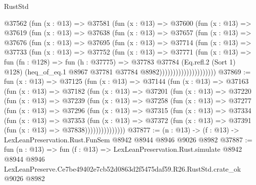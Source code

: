 \begin{lexlean}{RustStd}
\begin{coremodule}
                  @37562
                    (fun (x : @13) =>
                    @37581
                      (fun (x : @13) =>
                      @37600
                        (fun (x : @13) =>
                        @37619
                          (fun (x : @13) =>
                          @37638
                            (fun (x : @13) =>
                            @37657
                              (fun (x : @13) =>
                              @37676
                                (fun (x : @13) =>
                                @37695
                                  (fun (x : @13) =>
                                  @37714
                                    (fun (x : @13) =>
                                    @37733
                                      (fun (x : @13) =>
                                      @37752
                                        (fun (x : @13) =>
                                        @37771
                                          (fun (x : @13) =>
                                          fun (fn : @128) =>
                                          fun (h : @37775) =>
                                          @37783
                                            @37784
                                            (Eq.refl.{2} (Sort 1) @128)
                                            (heq_of_eq.{1}
                                              @8967
                                              @37781
                                              @37784
                                              @8982)))))))))))))))))))))
@37869 := fun (x : @13) =>
  @37125
    (fun (x : @13) =>
    @37144
      (fun (x : @13) =>
      @37163
        (fun (x : @13) =>
        @37182
          (fun (x : @13) =>
          @37201
            (fun (x : @13) =>
            @37220
              (fun (x : @13) =>
              @37239
                (fun (x : @13) =>
                @37258
                  (fun (x : @13) =>
                  @37277
                    (fun (x : @13) =>
                    @37296
                      (fun (x : @13) =>
                      @37315
                        (fun (x : @13) =>
                        @37334
                          (fun (x : @13) =>
                          @37353
                            (fun (x : @13) =>
                            @37372 (fun (x : @13) => @37391 (fun (x : @13) => @37838)))))))))))))))
@37877 := (n : @13) -> (f : @13) -> LexLeanPreservation.Rust.FunSem @8942 @8944 @8946 @9026 @8982
@37887 := fun (n : @13) =>
  fun (f : @13) =>
  LexLeanPreservation.Rust.simulate
    @8942
    @8944
    @8946
    LexLeanPreserve.Ce7be49402e7cb52d0863d2f5475daf59.R26.RustStd.crate_ok
    @9026
    @8982
\end{coremodule}
\end{lexlean}
